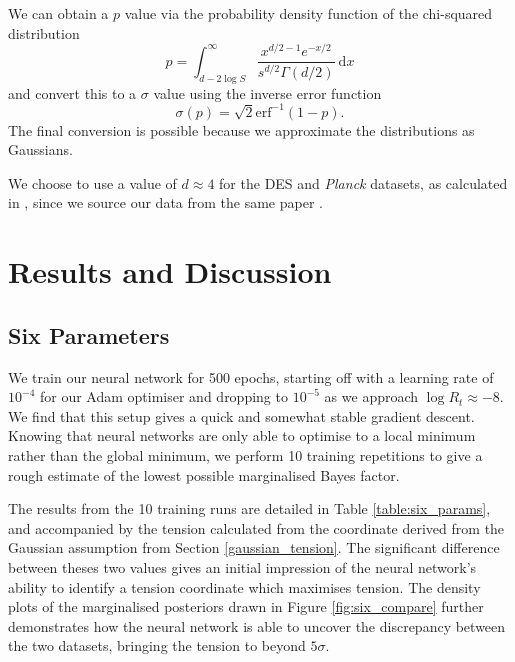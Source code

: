 \documentclass[%
 reprint,
 amsmath,amssymb,
 aps,
]{revtex4-2}
\begin{document}
We can obtain a $p$ value via the probability density function of the chi-squared distribution
\begin{equation}
    p = \int_{d - 2 \log S}^{\infty} \frac{x^{d/2 - 1} e^{-x/2}}{s^{d/2} \Gamma(d/2)} \ \textrm{d} x
\end{equation}
and convert this to a $\sigma$ value using the inverse error function
\begin{equation}
    \sigma (p) = \sqrt{2} \textrm{erf}^{-1} (1 - p).
\end{equation}
The final conversion is possible because we approximate the distributions as Gaussians.

We choose to use a value of $d \approx 4$ for the DES and \textit{Planck} datasets, as calculated in \cite{Handley2019}, since we source our data from the same paper \cite{Dataset}.



\section{Results and Discussion}

\subsection{Six Parameters} \label{section:six}

We train our neural network for 500 epochs, starting off with a learning rate of $10^{-4}$ for our Adam optimiser and dropping to $10^{-5}$ as we approach $\log R_t \approx -8$. We find that this setup gives a quick and somewhat stable gradient descent. Knowing that neural networks are only able to optimise to a local minimum rather than the global minimum, we perform 10 training repetitions to give a rough estimate of the lowest possible marginalised Bayes factor. 

The results from the 10 training runs are detailed in Table \ref{table:six_params}, and accompanied by the tension calculated from the coordinate derived from the Gaussian assumption from Section \ref{gaussian_tension}. The significant difference between theses two values gives an initial impression of the neural network's ability to identify a tension coordinate which maximises tension. The density plots of the marginalised posteriors drawn in Figure \ref{fig:six_compare} further demonstrates how the neural network is able to uncover the discrepancy between the two datasets, bringing the tension to beyond $5\sigma$.
\end{document}
